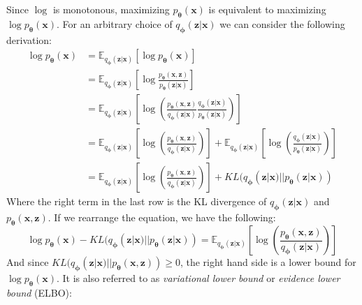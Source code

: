 \documentclass[12pt]{report}
\theoremstyle{definition}
\begin{document}
Since $\log$ is monotonous, maximizing $p_{\mathbf{\theta}}(\mathbf{x})$ is equivalent to maximizing $\log p_{\mathbf{\theta}}(\mathbf{x})$. For an arbitrary choice of $q_{\mathbf{\phi}}(\mathbf{z}|\mathbf{x})$ we can consider the following derivation:
\begin{equation}
\begin{split}
	\log p_{\mathbf{\theta}}(\mathbf{x}) 
	& = \mathbb{E}_{q_{\mathbf{\phi}}(\mathbf{z}|\mathbf{x})}\left[\log p_{\mathbf{\theta}}(\mathbf{x})\right] \\
	& = \mathbb{E}_{q_{\mathbf{\phi}}(\mathbf{z}|\mathbf{x})}\left[ \log \frac{p_{\mathbf{\theta}}(\mathbf{x}, \mathbf{z})}{p_{\mathbf{\theta}}(\mathbf{z}|\mathbf{x})} \right] \\
	& = \mathbb{E}_{q_{\mathbf{\phi}}(\mathbf{z}|\mathbf{x})}\left[ \log\left(\frac{p_{\mathbf{\theta}}(\mathbf{x}, \mathbf{z})}{q_{\mathbf{\phi}}(\mathbf{z}|\mathbf{x})}\frac{q_{\mathbf{\phi}}(\mathbf{z}|\mathbf{x})}{p_{\mathbf{\theta}}(\mathbf{z}|\mathbf{x})} \right) \right] \\
	& = \mathbb{E}_{q_{\mathbf{\phi}}(\mathbf{z}|\mathbf{x})}\left[ \log\left(\frac{p_{\mathbf{\theta}}(\mathbf{x}, \mathbf{z})}{q_{\mathbf{\phi}}(\mathbf{z}|\mathbf{x})}\right) \right] + \mathbb{E}_{q_{\mathbf{\phi}}(\mathbf{z}|\mathbf{x})}\left[ \log\left(\frac{q_{\mathbf{\phi}}(\mathbf{z}|\mathbf{x})}{p_{\mathbf{\theta}}(\mathbf{z}|\mathbf{x})} \right) \right] \\
	& = \mathbb{E}_{q_{\mathbf{\phi}}(\mathbf{z}|\mathbf{x})}\left[ \log\left(\frac{p_{\mathbf{\theta}}(\mathbf{x}, \mathbf{z})}{q_{\mathbf{\phi}}(\mathbf{z}|\mathbf{x})}\right) \right] + KL(q_{\mathbf{\phi}}(\mathbf{z}|\mathbf{x}) || p_{\mathbf{\theta}}(\mathbf{z}| \mathbf{x})) 
\end{split}
\end{equation}
Where the right term in the last row is the KL divergence of $q_{\mathbf{\phi}}(\mathbf{z}|\mathbf{x})$ and $p_{\mathbf{\theta}}(\mathbf{x}, \mathbf{z})$. If we rearrange the equation, we have the following:
\begin{equation}
	\log p_{\mathbf{\theta}}(\mathbf{x}) - KL(q_{\mathbf{\phi}}(\mathbf{z}|\mathbf{x}) || p_{\mathbf{\theta}}(\mathbf{z}| \mathbf{x})) = \mathbb{E}_{q_{\mathbf{\phi}}(\mathbf{z}|\mathbf{x})}\left[ \log\left(\frac{p_{\mathbf{\theta}}(\mathbf{x}, \mathbf{z})}{q_{\mathbf{\phi}}(\mathbf{z}|\mathbf{x})}\right) \right]
\end{equation}
	And since $KL(q_{\mathbf{\phi}}(\mathbf{z}|\mathbf{x}) || p_{\mathbf{\theta}}(\mathbf{x}, \mathbf{z})) \geq 0$, the right hand side is a lower bound for $\log p_{\mathbf{\theta}}(\mathbf{x})$. It is also referred to as \emph{variational lower bound} or \emph{evidence lower bound} (ELBO):
\end{document}
